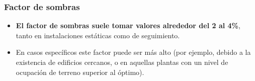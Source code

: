 \documentclass[serif, xcolor=dvipsnames]{beamer}
\begin{document}
\begin{frame}
  \frametitle{Factor de sombras}
  \begin{itemize}
  \item \textbf{El factor de sombras suele tomar valores alrededor del
      2 al 4\%}, tanto en instalaciones estáticas como de seguimiento.
  \item En casos específicos este factor puede ser más alto (por
    ejemplo, debido a la existencia de edificios cercanos, o en
    aquellas plantas con un nivel de ocupación de terreno superior al
    óptimo).
  \end{itemize}
\end{frame}



    


\end{document}
